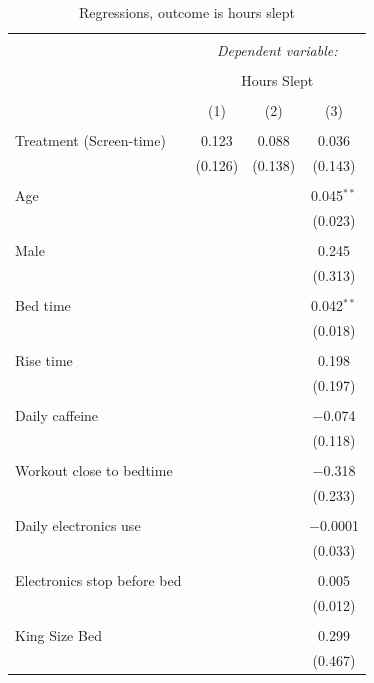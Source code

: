 \documentclass[]{article}
\begin{document}
\begin{table}[!htbp] \centering 
  \caption{\label{tab:hours_regressions} Regressions, outcome is hours slept} 
  \label{} 
\begin{tabular}{@{\extracolsep{5pt}}lccc} 
\\[-1.8ex]\hline 
\hline \\[-1.8ex] 
 & \multicolumn{3}{c}{\textit{Dependent variable:}} \\ 
\cline{2-4} 
\\[-1.8ex] & \multicolumn{3}{c}{Hours Slept} \\ 
\\[-1.8ex] & (1) & (2) & (3)\\ 
\hline \\[-1.8ex] 
 Treatment (Screen-time) & 0.123 & 0.088 & 0.036 \\ 
  & (0.126) & (0.138) & (0.143) \\ 
  & & & \\ 
 Age &  &  & 0.045$^{**}$ \\ 
  &  &  & (0.023) \\ 
  & & & \\ 
 Male &  &  & 0.245 \\ 
  &  &  & (0.313) \\ 
  & & & \\ 
 Bed time &  &  & 0.042$^{**}$ \\ 
  &  &  & (0.018) \\ 
  & & & \\ 
 Rise time &  &  & 0.198 \\ 
  &  &  & (0.197) \\ 
  & & & \\ 
 Daily caffeine &  &  & $-$0.074 \\ 
  &  &  & (0.118) \\ 
  & & & \\ 
 Workout close to bedtime &  &  & $-$0.318 \\ 
  &  &  & (0.233) \\ 
  & & & \\ 
 Daily electronics use &  &  & $-$0.0001 \\ 
  &  &  & (0.033) \\ 
  & & & \\ 
 Electronics stop before bed &  &  & 0.005 \\ 
  &  &  & (0.012) \\ 
  & & & \\ 
 King Size Bed &  &  & 0.299 \\ 
  &  &  & (0.467) \\ 

\end{tabular}
\end{table}
\end{document}
